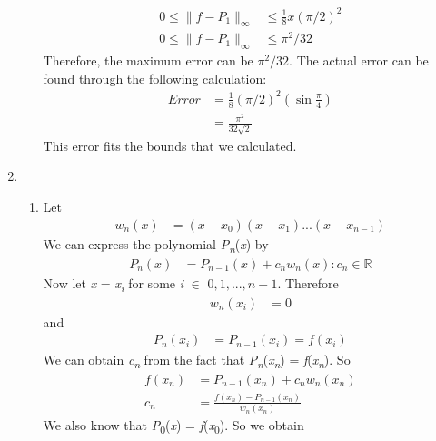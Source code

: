\documentclass{article}
\begin{document}
\begin{enumerate}
\begin{enumerate}
\begin{align*}
                    0 \leq \| f-P_1 \|_{\infty} &\leq \frac{1}{8}x(\pi/2)^2 \\
                    0 \leq \| f-P_1 \|_{\infty} &\leq \pi^2/32
            \end{align*}
            Therefore, the maximum error can be $ \pi^2/32 $. The actual error can be found through the following calculation:
            \begin{align*}
                Error &= \frac{1}{8}(\pi/2)^2(\sin{\frac{\pi}{4}}) \\
                    & = \frac{\pi^2}{32\sqrt{2}}
            \end{align*}
            This error fits the bounds that we calculated. 
        \end{enumerate}
    \item %
        \begin{enumerate}
            \item %
            Let
                \begin{align*}
                    w_{n}(x) &= (x-x_{0})(x-x_{1})...(x-x_{n-1})
                \end{align*}
            We can express the polynomial \textit{P}\textsubscript{\textit{n}}(\textit{x}) by
                \begin{align*}
                    P_{n}(x) &= P_{n-1}(x) + c_{n}w_{n}(x) : c_{n} \in \mathbb{R} 
                \end{align*}
            Now let \textit{x} = \textit{x\textsubscript{i}} for some \textit{i} $ \in $ $ {0,1,...,\textit{n}-1} $. Therefore
                \begin{align*}
                    w_{n}(x_{i}) &= 0
                \end{align*}
            and
                \begin{align*}
                    P_{n}(x_{i}) &= P_{n-1}(x_{i}) = f(x_{i})
                \end{align*}
            We can obtain \textit{c\textsubscript{n}} from the fact that \textit{P\textsubscript{n}}(\textit{x\textsubscript{n}}) = \textit{f}(\textit{x\textsubscript{n}}). So
                \begin{align*}
                    f(x_{n}) &= P_{n-1}(x_{n}) + c_{n}w_{n}(x_{n}) \\
                    c_{n} &= \frac{f(x_{n}) - P_{n-1}(x_{n})}{w_{n}(x_{n})}
                \end{align*}
            We also know that \textit{P}\textsubscript{0}(\textit{x}) = \textit{f}(\textit{x}\textsubscript{0}). So we obtain

\end{enumerate}
\end{enumerate}
\end{document}
